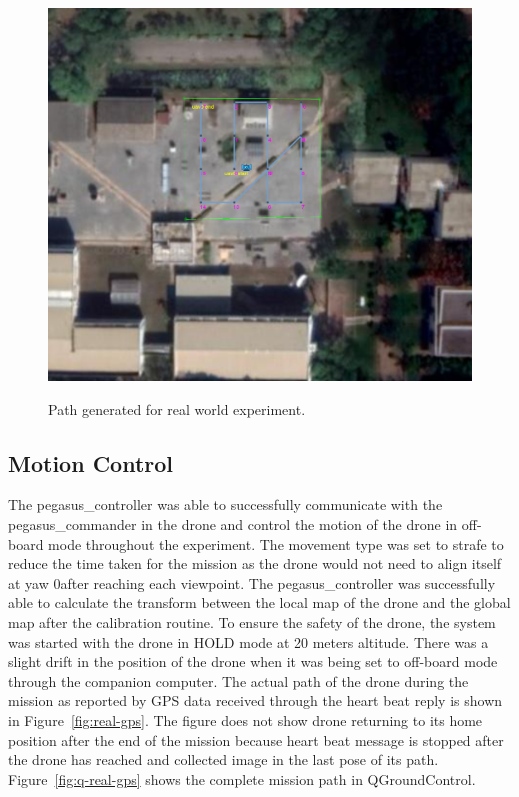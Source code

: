\begin{figure}
	\centering
	\caption[Path generated for real world experiment.]{\small Path generated for real world experiment.} 
	\includegraphics[width=5in]{figures/experiment/real_mapviz_plan}
	\label{fig:real-path}
\end{figure}

\subsection{Motion Control}
The pegasus\_controller was able to successfully communicate with the pegasus\_commander in the drone and control the motion of the drone in off-board mode throughout the experiment. The movement type was set to strafe to reduce the time taken for the mission as the drone would not need to align itself at yaw 0\degree after reaching each viewpoint. The pegasus\_controller was successfully able to calculate the transform between the local map of the drone and the global map after the calibration routine. To ensure the safety of the drone, the system was started with the drone in HOLD mode at 20 meters altitude. There was a slight drift in the position of the drone when it was being set to off-board mode through the companion computer. The actual path of the drone during the mission as reported by GPS data received through the heart beat reply is shown in Figure~\ref{fig:real-gps}. The figure does not show drone returning to its home position after the end of the mission because heart beat message is stopped after the drone has reached and collected image in the last pose of its path. Figure~\ref{fig:q-real-gps} shows the complete mission path in QGroundControl.


